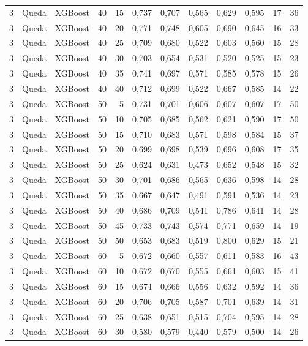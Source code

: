 \begin{longtable}{@{}rllrrrrrrrrr@{}}
3 & Queda & XGBoost & 40 & 15 & 0,737 & 0,707 & 0,565 & 0,629 & 0,595 & 17 & 36 \\
3 & Queda & XGBoost & 40 & 20 & 0,771 & 0,748 & 0,605 & 0,690 & 0,645 & 16 & 33 \\
3 & Queda & XGBoost & 40 & 25 & 0,709 & 0,680 & 0,522 & 0,603 & 0,560 & 15 & 28 \\
3 & Queda & XGBoost & 40 & 30 & 0,703 & 0,654 & 0,531 & 0,520 & 0,525 & 15 & 23 \\
3 & Queda & XGBoost & 40 & 35 & 0,741 & 0,697 & 0,571 & 0,585 & 0,578 & 15 & 26 \\
3 & Queda & XGBoost & 40 & 40 & 0,712 & 0,699 & 0,522 & 0,667 & 0,585 & 14 & 22 \\
3 & Queda & XGBoost & 50 & 5 & 0,731 & 0,701 & 0,606 & 0,607 & 0,607 & 17 & 50 \\
3 & Queda & XGBoost & 50 & 10 & 0,705 & 0,685 & 0,562 & 0,621 & 0,590 & 17 & 50 \\
3 & Queda & XGBoost & 50 & 15 & 0,710 & 0,683 & 0,571 & 0,598 & 0,584 & 15 & 37 \\
3 & Queda & XGBoost & 50 & 20 & 0,699 & 0,698 & 0,539 & 0,696 & 0,608 & 17 & 35 \\
3 & Queda & XGBoost & 50 & 25 & 0,624 & 0,631 & 0,473 & 0,652 & 0,548 & 15 & 32 \\
3 & Queda & XGBoost & 50 & 30 & 0,701 & 0,686 & 0,565 & 0,636 & 0,598 & 14 & 28 \\
3 & Queda & XGBoost & 50 & 35 & 0,667 & 0,647 & 0,491 & 0,591 & 0,536 & 14 & 23 \\
3 & Queda & XGBoost & 50 & 40 & 0,686 & 0,709 & 0,541 & 0,786 & 0,641 & 14 & 28 \\
3 & Queda & XGBoost & 50 & 45 & 0,733 & 0,743 & 0,574 & 0,771 & 0,659 & 14 & 19 \\
3 & Queda & XGBoost & 50 & 50 & 0,653 & 0,683 & 0,519 & 0,800 & 0,629 & 15 & 21 \\
3 & Queda & XGBoost & 60 & 5 & 0,672 & 0,660 & 0,557 & 0,611 & 0,583 & 16 & 43 \\
3 & Queda & XGBoost & 60 & 10 & 0,672 & 0,670 & 0,555 & 0,661 & 0,603 & 15 & 41 \\
3 & Queda & XGBoost & 60 & 15 & 0,674 & 0,666 & 0,556 & 0,632 & 0,592 & 14 & 36 \\
3 & Queda & XGBoost & 60 & 20 & 0,706 & 0,705 & 0,587 & 0,701 & 0,639 & 14 & 31 \\
3 & Queda & XGBoost & 60 & 25 & 0,638 & 0,651 & 0,515 & 0,704 & 0,595 & 14 & 28 \\
3 & Queda & XGBoost & 60 & 30 & 0,580 & 0,579 & 0,440 & 0,579 & 0,500 & 14 & 26 \\

\end{longtable}

